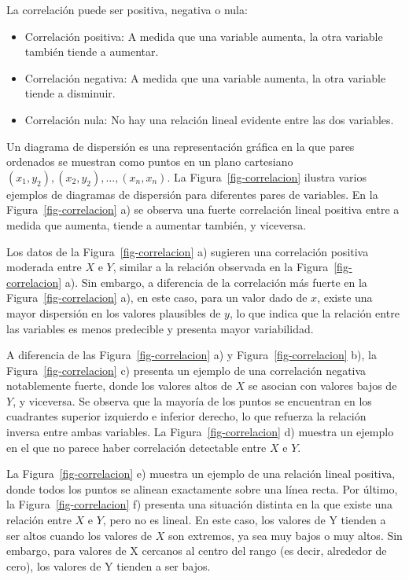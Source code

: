 \documentclass[
  us-letterpaper,
]{scrreprt}
\theoremstyle{plain}
\theoremstyle{definition}
\theoremstyle{definition}
\theoremstyle{remark}
\begin{document}
La correlación puede ser positiva, negativa o nula:

\begin{itemize}
\item
  Correlación positiva: A medida que una variable aumenta, la otra
  variable también tiende a aumentar.
\item
  Correlación negativa: A medida que una variable aumenta, la otra
  variable tiende a disminuir.
\item
  Correlación nula: No hay una relación lineal evidente entre las dos
  variables.
\end{itemize}

Un diagrama de dispersión es una representación gráfica en la que pares
ordenados se muestran como puntos en un plano cartesiano
\((x_1,y_2),(x_2,y_2),\dots, (x_n,x_n).\) La
Figura~\ref{fig-correlacion} ilustra varios ejemplos de diagramas de
dispersión para diferentes pares de variables. En la
Figura~\ref{fig-correlacion} a) se observa una fuerte correlación lineal
positiva entre a medida que aumenta, tiende a aumentar también, y
viceversa.

Los datos de la Figura~\ref{fig-correlacion} a) sugieren una correlación
positiva moderada entre \(X\) e \(Y\), similar a la relación observada
en la Figura~\ref{fig-correlacion} a). Sin embargo, a diferencia de la
correlación más fuerte en la Figura~\ref{fig-correlacion} a), en este
caso, para un valor dado de \(x\), existe una mayor dispersión en los
valores plausibles de \(y\), lo que indica que la relación entre las
variables es menos predecible y presenta mayor variabilidad.

A diferencia de las Figura~\ref{fig-correlacion} a) y
Figura~\ref{fig-correlacion} b), la Figura~\ref{fig-correlacion} c)
presenta un ejemplo de una correlación negativa notablemente fuerte,
donde los valores altos de \(X\) se asocian con valores bajos de \(Y\),
y viceversa. Se observa que la mayoría de los puntos se encuentran en
los cuadrantes superior izquierdo e inferior derecho, lo que refuerza la
relación inversa entre ambas variables. La Figura~\ref{fig-correlacion}
d) muestra un ejemplo en el que no parece haber correlación detectable
entre \(X\) e \(Y\).

La Figura~\ref{fig-correlacion} e) muestra un ejemplo de una relación
lineal positiva, donde todos los puntos se alinean exactamente sobre una
línea recta. Por último, la Figura~\ref{fig-correlacion} f) presenta una
situación distinta en la que existe una relación entre \(X\) e \(Y\),
pero no es lineal. En este caso, los valores de Y tienden a ser altos
cuando los valores de \(X\) son extremos, ya sea muy bajos o muy altos.
Sin embargo, para valores de X cercanos al centro del rango (es decir,
alrededor de cero), los valores de Y tienden a ser bajos.
\end{document}
